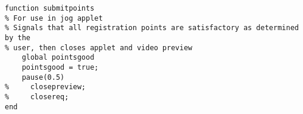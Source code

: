 \begin{lstlisting}
function submitpoints
% For use in jog applet
% Signals that all registration points are satisfactory as determined by the
% user, then closes applet and video preview
    global pointsgood
    pointsgood = true;
    pause(0.5)
%     closepreview;
%     closereq;
end
\end{lstlisting}